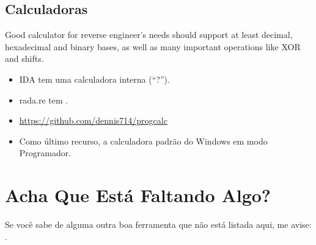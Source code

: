 \subsection{Calculadoras}

Good calculator for reverse engineer's needs should support at least decimal, hexadecimal and binary bases,
as well as many important operations like XOR and shifts.

\begin{itemize}

\item IDA tem uma calculadora interna (``?'').

\item rada.re tem .

\item \url{https://github.com/dennis714/progcalc}

\item Como último recurso, a calculadora padrão do Windows em modo Programador.

\end{itemize}

\section{Acha Que Está Faltando Algo?}

Se você sabe de alguma outra boa ferramenta que não está listada aqui, me avise:\\
\TT{\EMAIL}.

